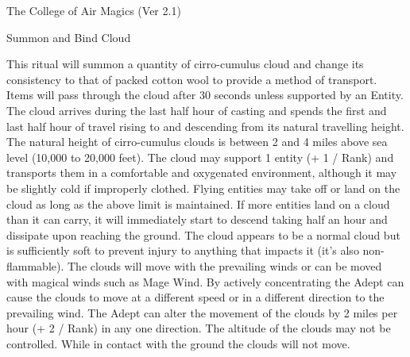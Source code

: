 \begin{Chapter}{The College of Air Magics (Ver 2.1)}
\begin{ritual}[R-4]{Summon and Bind Cloud}
\begin{effects}
This ritual will summon a quantity of cirro-cumulus cloud and change
its consistency to that of packed cotton wool to provide a method of
transport.  Items will pass through the cloud after 30 seconds unless
supported by an Entity.  The cloud arrives during the last half hour
of casting and spends the first and last half hour of travel rising to
and descending from its natural travelling height.  The natural height
of cirro-cumulus clouds is between 2 and 4 miles above sea level
(10,000 to 20,000 feet). The cloud may support 1 entity (+ 1 / Rank)
and transports them in a comfortable and oxygenated environment,
although it may be slightly cold if improperly clothed.  Flying
entities may take off or land on the cloud as long as the above limit
is maintained. If more entities land on a cloud than it can carry, it
will immediately start to descend taking half an hour and dissipate
upon reaching the ground.  The cloud appears to be a normal cloud but
is sufficiently soft to prevent injury to anything that impacts it
(it’s also non-flammable). The clouds will move with the prevailing
winds or can be moved with magical winds such as Mage Wind. By
actively concentrating the Adept can cause the clouds to move at a
different speed or in a different direction to the prevailing wind.
The Adept can alter the movement of the clouds by 2 miles per hour (+
2 / Rank) in any one direction.  The altitude of the clouds may not be
controlled.  While in contact with the ground the clouds will not
move.
\end{effects}
\end{ritual}

\begin{table*}

\end{table*}
\end{Chapter}
